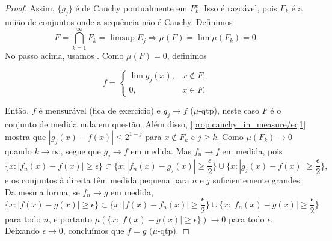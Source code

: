 \begin{proof}
    Assim, $\{g_j\}$ é de Cauchy pontualmente em $F_k^c$. Isso é razoável, pois $F_k$ é a união de conjuntos onde a sequência não é Cauchy. Definimos $$F = \bigcap_{k=1}^\infty F_k = \limsup E_j\Rightarrow \mu(F) = \lim \mu(F_k) = 0.$$ No passo acima, usamos . Como $\mu(F) = 0$, definimos
    
    \begin{equation*}
        f=\begin{cases}
            \lim g_j(x), & x \notin F, \\
            0, & x \in F.
        \end{cases}
    \end{equation*}
    
    Então, $f$ é mensurável (fica de exercício) e $g_j \to f$ (\(\mu\)-qtp), neste caso $F$ é o conjunto de medida nula em questão. Além disso, \eqref{prop:cauchy_in_measure/eq1} mostra que $|g_j(x) - f(x)| \leq 2^{1-j}$ para $x \notin F_k$ e $j \geq k$. Como $\mu(F_k) \to 0$ quando $k \to \infty$, segue que $g_j \to f$ em medida. Mas $f_n \to f$ em medida, pois
    \begin{equation*}
        \{x : |f_n(x) - f(x)| \geq \epsilon\} \subset \{x : |f_n(x) - g_j(x)| \geq \frac{\epsilon}{2}\} \cup \{x : |g_j(x) - f(x)| \geq \frac{\epsilon}{2}\},
    \end{equation*}
    e os conjuntos à direita têm medida pequena para $n$ e $j$ suficientemente grandes. Da mesma forma, se $f_n \to g$ em medida,
    \begin{equation*}
        \{x : |f(x) - g(x)| \geq \epsilon\} \subset \{x : |f(x) - f_n(x)| \geq \frac{\epsilon}{2}\} \cup \{x : |f_n(x) - g(x)| \geq \frac{\epsilon}{2}\}
    \end{equation*}
    para todo $n$, e portanto $\mu(\{x : |f(x) - g(x)| \geq \epsilon\}) \to 0$ para todo $\epsilon$. Deixando $\epsilon \to 0$, concluímos que $f = g$ \((\mu\)-qtp).


\end{proof}